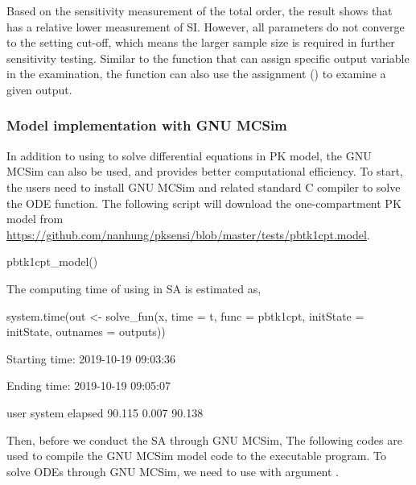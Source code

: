 Based on the sensitivity measurement of the total order, the result
shows that  has a relative lower measurement of SI. However,
all parameters do not converge to the setting cut-off, which means the
larger sample size is required in further sensitivity testing. Similar
to the  function that can assign specific output variable in
the examination, the  function can also use the assignment
() to examine a given output.

\hypertarget{model-implementation-with-gnu-mcsim}{%
\subsubsection{Model implementation with GNU
MCSim}\label{model-implementation-with-gnu-mcsim}}

In addition to using  to solve differential equations
in PK model, the GNU MCSim can also be used, and provides better
computational efficiency. To start, the users need to install GNU MCSim
and related standard C compiler to solve the ODE function. The following
script will download the one-compartment PK model from
\url{https://github.com/nanhung/pksensi/blob/master/tests/pbtk1cpt.model}.

\begin{Schunk}
\begin{Sinput}
pbtk1cpt_model()
\end{Sinput}
\end{Schunk}

The computing time of using  in SA is estimated as,

\begin{Schunk}
\begin{Sinput}
system.time(out <- solve_fun(x, time = t, 
                             func = pbtk1cpt, initState = initState, 
                             outnames = outputs))
\end{Sinput}
\begin{Soutput}
  Starting time: 2019-10-19 09:03:36
\end{Soutput}
\begin{Soutput}
  Ending time: 2019-10-19 09:05:07
\end{Soutput}
\begin{Soutput}
     user  system elapsed 
   90.115   0.007  90.138
\end{Soutput}
\end{Schunk}

Then, before we conduct the SA through GNU MCSim, The following codes
are used to compile the GNU MCSim model code to the executable program.
To solve ODEs through GNU MCSim, we need to use 
with argument .

